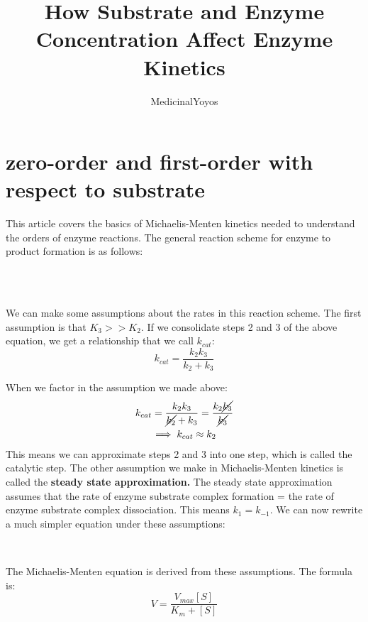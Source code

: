 \documentclass{article}
\title{How Substrate and Enzyme Concentration Affect Enzyme Kinetics}
\author{MedicinalYoyos}
\begin{document}
\maketitle
\section{zero-order and first-order with respect to substrate}
This article covers the basics of Michaelis-Menten kinetics needed to understand the orders of enzyme reactions. The general reaction scheme for enzyme to product formation is as follows:
\begin{center}
\\
\end{center}
\\

We can make some assumptions about the rates in this reaction scheme. The first assumption is that $K_3 >> K_2$. If we consolidate steps 2 and 3 of the above equation, we get a relationship that we call $k_{cat}$:
\begin{equation}
    k_{cat} = \frac{k_2k_3}{k_2 + k_3}
\end{equation}

When we factor in the assumption we made above:
\begin{gather}
    k_{cat} = \frac{k_2k_3}{\cancel{k_2} + k_3} = \frac{k_2\cancel{k_3}}{\cancel{k_3}} \nonumber \\
    \implies k_{cat} \approx k_2
\end{gather}
This means we can approximate steps 2 and 3 into one step, which is called the catalytic step. The other assumption we make in Michaelis-Menten kinetics is called the \textbf{steady state approximation.} The steady state approximation assumes that the rate of enzyme substrate complex formation = the rate of enzyme substrate complex dissociation. This means $k_1 = k_{-1}$.
We can now rewrite a much simpler equation under these assumptions:

\begin{center}
\\
\end{center}

The Michaelis-Menten equation is derived from these assumptions. The formula is:
\begin{equation}
    V = \frac{V_{max}[S]}{K_m + [S]} \label{1}
\end{equation}
\end{document}
